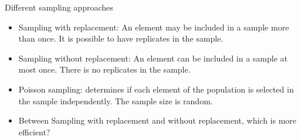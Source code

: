 \documentclass[serif,envcountsect,table,t]{beamer}%
\begin{document}
\begin{frame}{Different sampling approaches}
  \begin{itemize}
  \item Sampling with replacement: An element may be included in a sample more than once. It is possible to have replicates in the sample.
  \item Sampling without replacement: An element can be included in a sample at most once. There is no replicates in the sample.
  \item Poisson sampling: determines if each element of the population is selected in the sample independently. The sample size is random.
  \item Between Sampling with replacement and without replacement, which is more efficient?
  \end{itemize}
\end{frame}
\end{document}
